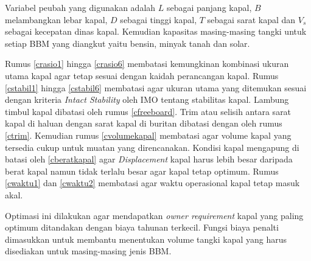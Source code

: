     Variabel peubah yang digunakan adalah $L$ sebagai panjang kapal, $B$ melambangkan lebar kapal, $D$ sebagai tinggi kapal, $T$ sebagai sarat kapal dan $V_s$ sebagai kecepatan dinas kapal. Kemudian kapasitas masing-masing tangki untuk setiap BBM yang diangkut yaitu bensin, minyak tanah dan solar.

    Rumus \ref{crasio1} hingga \ref{crasio6} membatasi kemungkinan kombinasi ukuran utama kapal agar tetap sesuai dengan kaidah perancangan kapal. Rumus \ref{cstabil1} hingga \ref{cstabil6} membatasi agar ukuran utama yang ditemukan sesuai dengan kriteria \emph{Intact Stability} oleh IMO tentang stabilitas kapal. Lambung timbul kapal dibatasi oleh rumus \ref{cfreeboard}. Trim atau selisih antara sarat kapal di haluan dengan sarat kapal di buritan dibatasi dengan oleh rumus \ref{ctrim}. Kemudian rumus \ref{cvolumekapal} membatasi agar volume kapal yang tersedia cukup untuk muatan yang direncanakan. Kondisi kapal mengapung di batasi oleh \ref{cberatkapal} agar \emph{Displacement} kapal harus lebih besar daripada berat kapal namun tidak terlalu besar agar kapal tetap optimum. Rumus \ref{cwaktu1} dan \ref{cwaktu2} membatasi agar waktu operasional kapal tetap masuk akal.

    Optimasi ini dilakukan agar mendapatkan \emph{owner requirement} kapal yang paling optimum ditandakan dengan biaya tahunan terkecil. Fungsi biaya penalti dimasukkan untuk membantu menentukan volume tangki kapal yang harus disediakan untuk masing-masing jenis BBM.